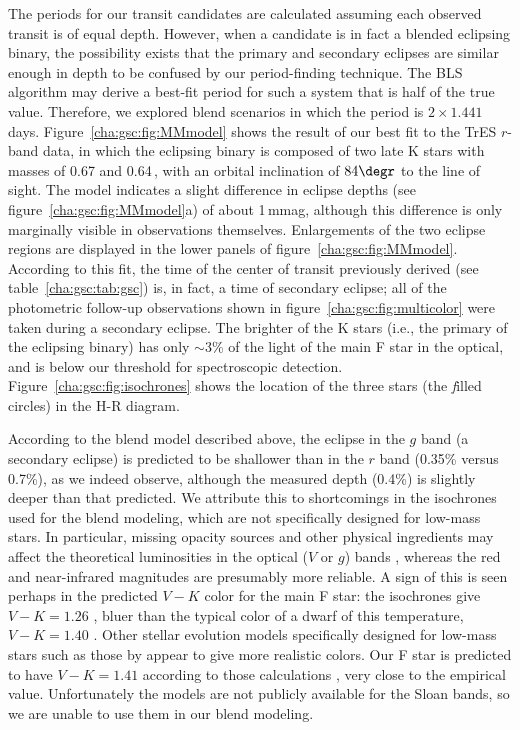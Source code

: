 The periods for our transit candidates are calculated assuming each
observed transit is of equal depth. However, when a candidate is in
fact a blended eclipsing binary, the possibility exists that the
primary and secondary eclipses are similar enough in depth to be
confused by our period-finding technique. The BLS algorithm may derive
a best-fit period for such a system that is half of the true value.
Therefore, we explored blend scenarios in which the period is $2
\times 1.441$ days. Figure~\ref{cha:gsc:fig:MMmodel} shows the result of our
best fit to the TrES $r$-band data, in which the eclipsing binary is
composed of two late K stars with masses of 0.67 and
0.64\,\msun, with an orbital inclination of $84\degr$ to the
line of sight.  The model indicates a slight difference in eclipse
depths (see figure~\ref{cha:gsc:fig:MMmodel}a) of about 1\,mmag, although this
difference is only marginally visible in observations themselves.
Enlargements of the two eclipse regions are displayed in the lower
panels of figure~\ref{cha:gsc:fig:MMmodel}.  According to this fit, the time
of the center of transit previously derived (see table~\ref{cha:gsc:tab:gsc})
is, in fact, a time of secondary eclipse; all of the photometric
follow-up observations shown in figure~\ref{cha:gsc:fig:multicolor} were taken
during a secondary eclipse.  The brighter of the K stars (i.e., the
primary of the eclipsing binary) has only $\sim$3\% of the light of
the main F star in the optical, and is below our threshold for
spectroscopic detection.  Figure~\ref{cha:gsc:fig:isochrones} shows the
location of the three stars (the {\textit filled circles}) in the H-R diagram.

According to the blend model described above, the eclipse in the $g$
band (a secondary eclipse) is predicted to be shallower than in the
$r$ band (0.35\% versus 0.7\%), as we indeed observe, although the
measured depth (0.4\%) is slightly deeper than that predicted. We attribute
this to shortcomings in the isochrones used for the blend modeling,
which are not specifically designed for low-mass stars. In particular,
missing opacity sources and other physical ingredients may affect the
theoretical luminosities in the optical ($V$ or $g$) bands
\citep{Baraffe_Chabrier_Allard:aa:1998a,
  Delfosse_Forveille_Segransan:aa:2000a,
  Chabrier_Baraffe_Allard:asp:2005a}, whereas the red and near-infrared magnitudes are presumably more reliable. A sign of this is
seen perhaps in the predicted $V-K$ color for the main F star: the
isochrones give $V-K = 1.26$ \citep[in the Johnson system as defined
by][]{Bessell_Brett:pasp:1988a}, bluer than the typical color of a
dwarf of this temperature, $V-K = 1.40$
\citep[e.g.,][]{Bessell_Brett:pasp:1988a}.  Other stellar evolution
models specifically designed for low-mass stars such as those by
\citet{Baraffe_Chabrier_Allard:aa:1998a} appear to give more realistic
colors. Our F star is predicted to have $V-K = 1.41$ according to
those calculations \citep[after transformation of the isochrone $K$
magnitudes from the CIT to the Johnson system,
following][]{Leggett:apjs:1992}, very close to the empirical
value. Unfortunately the \citet{Baraffe_Chabrier_Allard:aa:1998a}
models are not publicly available for the Sloan bands, so we are
unable to use them in our blend modeling.

